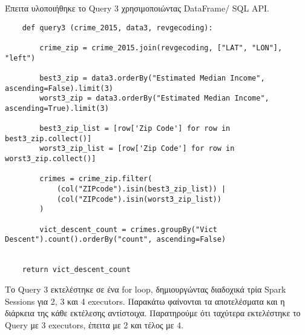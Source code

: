 \documentclass{article}
\begin{document}
\vspace{2\baselineskip}

Έπειτα υλοποιήθηκε το Query 3 χρησιμοποιώντας DataFrame/ SQL API. 

\begin{lstlisting}
    def query3 (crime_2015, data3, revgecoding):

        crime_zip = crime_2015.join(revgecoding, ["LAT", "LON"], "left")

        best3_zip = data3.orderBy("Estimated Median Income", ascending=False).limit(3)
        worst3_zip = data3.orderBy("Estimated Median Income", ascending=True).limit(3)
        
        best3_zip_list = [row['Zip Code'] for row in best3_zip.collect()] 
        worst3_zip_list = [row['Zip Code'] for row in worst3_zip.collect()]

        crimes = crime_zip.filter(
            (col("ZIPcode").isin(best3_zip_list)) | 
            (col("ZIPcode").isin(worst3_zip_list))
        )
        
        vict_descent_count = crimes.groupBy("Vict Descent").count().orderBy("count", ascending=False)


    return vict_descent_count
\end{lstlisting}

\vspace{3\baselineskip}

Το Query 3 εκτελέστηκε σε ένα for loop, δημιουργώντας διαδοχικά τρία Spark Sessions για 2, 3 και 4 executors. Παρακάτω φαίνονται τα αποτελέσματα και η διάρκεια της κάθε εκτέλεσης αντίστοιχα. 
Παρατηρούμε ότι ταχύτερα εκτελέστηκε το Query με 3 executors, έπειτα με 2 και τέλος με 4. \\
\end{document}
